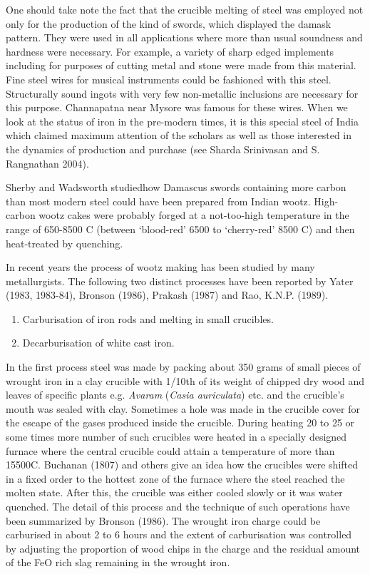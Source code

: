 One should take note the fact that the crucible melting of steel was employed not only for the production of the kind of swords, which displayed the damask pattern. They were used in all applications where more than usual soundness and hardness were necessary. For example, a variety of sharp edged implements including for purposes of cutting metal and stone were made from this material. Fine steel wires for musical instruments could be fashioned with this steel. Structurally sound ingots with very few non-metallic inclusions are necessary for this purpose. Channapatna near Mysore was famous for these wires. When we look at the status of iron in the pre-modern times, it is this special steel of India which claimed maximum attention of the scholars as well as those interested in the dynamics of production and purchase (see Sharda Srinivasan and S. Rangnathan 2004).

Sherby and Wadsworth studiedhow Damascus swords containing more carbon than most modern steel could have been prepared from Indian wootz. High-carbon wootz cakes were probably forged at a not-too-high temperature in the range of 650-8500 C (between ‘blood-red’ 6500 to ‘cherry-red’ 8500 C) and then heat-treated by quenching.

In recent years the process of wootz making has been studied by many metallurgists. The following two distinct processes have been reported by Yater (1983, 1983-84), Bronson (1986), Prakash (1987) and Rao, K.N.P. (1989).

\begin{enumerate}
\item Carburisation of iron rods and melting in small crucibles.

 \item Decarburisation of white cast iron.

\end{enumerate}

In the first process steel was made by packing about 350 grams of small pieces of wrought iron in a clay crucible with 1/10th of its weight of chipped dry wood and leaves of specific plants e.g. \textit{Avaram} (\textit{Casia auriculata}) etc. and the crucible's mouth was sealed with clay. Sometimes a hole was made in the crucible cover for the escape of the gases produced inside the crucible. During heating 20 to 25 or some times more number of such crucibles were heated in a specially designed furnace where the central crucible could attain a temperature of more than 15500C. Buchanan (1807) and others give an idea how the crucibles were shifted in a fixed order to the hottest zone of the furnace where the steel reached the molten state. After this, the crucible was either cooled slowly or it was water quenched. The detail of this process and the technique of such operations have been summarized by Bronson (1986). The wrought iron charge could be carburised in about 2 to 6 hours and the extent of carburisation was controlled by adjusting the proportion of wood chips in the charge and the residual amount of the FeO rich slag remaining in the wrought iron.

